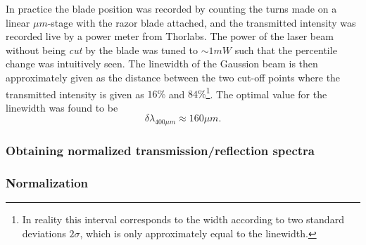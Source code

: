 In practice the blade position was recorded by counting the turns made on a linear $\mu m$-stage with the razor blade attached, and the transmitted intensity was recorded live by a power meter from Thorlabs. The power of the laser beam without being \emph{cut} by the blade was tuned to $\sim 1 mW$ such that the percentile change was intuitively seen. The linewidth of the Gaussion beam is then approximately given as the distance between the two cut-off points where the transmitted intensity is given as $16\%$ and $84\%$\footnote{In reality this interval corresponds to the width according to two standard deviations $2\sigma$, which is only approximately equal to the linewidth.}. The optimal value for the linewidth was found to be
\begin{equation}
    \delta \lambda_{400 \mu m} \approx 160 \mu m.
\end{equation}

\subsubsection{Obtaining normalized transmission/reflection spectra}



\subsubsection{Normalization}

